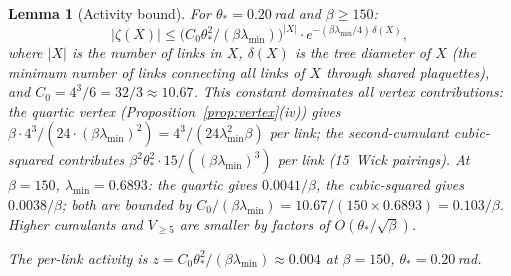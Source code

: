 \documentclass[11pt]{article}
\newtheorem{lemma}[theorem]{Lemma}
\theoremstyle{definition}
\begin{document}
\begin{lemma}[Activity bound]\label{lem:activity}
For $\theta_*=0.20$\,rad and $\beta\ge 150$:
\begin{equation}
|\zeta(X)|\le\bigl(C_0\theta_*^2/(\beta\lambda_{\min})\bigr)^{|X|}
\cdot e^{-(\beta\lambda_{\min}/4)\,\delta(X)},
\end{equation}
where $|X|$ is the number of links in $X$, $\delta(X)$ is the
tree diameter of $X$ (the minimum number of links connecting all
links of $X$ through shared plaquettes), and
$C_0=4^3/6=32/3\approx 10.67$.  This constant dominates
all vertex contributions: the quartic vertex
(Proposition~\ref{prop:vertex}(iv)) gives
$\beta\cdot 4^3/(24\cdot(\beta\lambda_{\min})^2)
=4^3/(24\lambda_{\min}^2\beta)$ per link; the second-cumulant
cubic-squared contributes
$\beta^2\theta_*^2\cdot 15/((\beta\lambda_{\min})^3)$ per link
(15~Wick pairings).  At $\beta=150$, $\lambda_{\min}=0.6893$:
the quartic gives $0.0041/\beta$, the cubic-squared gives
$0.0038/\beta$; both are bounded by
$C_0/(\beta\lambda_{\min})=10.67/(150\times 0.6893)=0.103/\beta$.
Higher cumulants and $V_{\ge 5}$ are smaller by factors of
$O(\theta_*/\sqrt{\beta})$.

The per-link activity is $z=C_0\theta_*^2/(\beta\lambda_{\min})
\approx 0.004$ at $\beta=150$, $\theta_*=0.20$\,rad.
\end{lemma}
\end{document}
